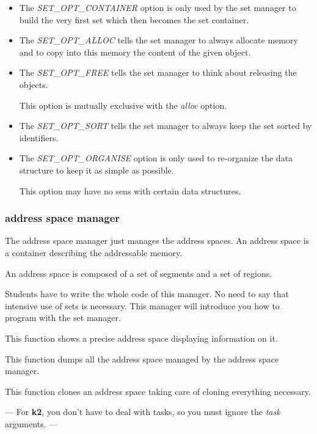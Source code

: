 \begin{itemize}
  \item
    The \textit{SET\_OPT\_CONTAINER} option is only used by the set
    manager to build the very first set which then becomes the set
    container.
  \item
    The \textit{SET\_OPT\_ALLOC} tells the set manager to always allocate
    memory and to copy into this memory the content of the given object.
  \item
    The \textit{SET\_OPT\_FREE} tells the set manager to think about
    releasing the objects.

    This option is mutually exclusive with the \textit{alloc} option.
  \item
    The \textit{SET\_OPT\_SORT} tells the set manager to always keep
    the set sorted by identifiers.
  \item
    The \textit{SET\_OPT\_ORGANISE} option is only used to re-organize
    the data structure to keep it as simple as possible.

    This option may have no sens with certain data structures.
\end{itemize}

%
%

\subsubsection{address space manager}

The address space manager just manages the address spaces. An address
space is a container describing the addressable memory.

An address space is composed of a set of segments and a set of regions.

Students have to write the whole code of this manager. No need to say
that intensive use of  sets is necessary. This manager will introduce
you how to program with the set manager.

	  {This function shows a precise address space displaying information
	    on it.}

	  {This function dumps all the address space managed by the address
	    space manager.}

	  {This function clones an address space taking care of cloning
	    everything necessary.

	    ---
	    For \textbf{k2}, you don't have to deal with tasks, so you must
	    ignore the \textit{task} arguments.
	    ---}

